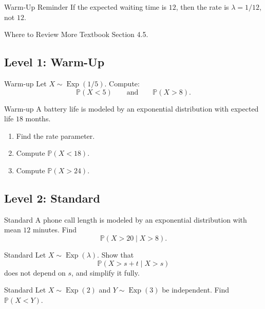 \documentclass[12pt]{article}
\newcommand{\PP}{\mathbb{P}}
\newcommand{\Exp}{\operatorname{Exp}}
\newcommand{\writespace}[1]{\vspace*{#1}}
\newcommand{\medws}{\writespace{1.8cm}}
\newcounter{problem}[section]
\begin{document}
\begin{examplebox}{Warm-Up Reminder}
If the expected waiting time is $12$, then the rate is $\lambda=1/12$, not $12$.
\end{examplebox}

\begin{reviewbox}{Where to Review More}
Textbook Section 4.5.
\end{reviewbox}

\subsection*{Level 1: Warm-Up}

\begin{practiceproblem}{Warm-up}
Let $X\sim\Exp(1/5)$. Compute:
\[
  \PP(X<5)
  \qquad\text{and}\qquad
  \PP(X>8).
\]
\end{practiceproblem}
\medws

\begin{practiceproblem}{Warm-up}
A battery life is modeled by an exponential distribution with expected life $18$ months.
\begin{enumerate}
  \item Find the rate parameter.
  \item Compute $\PP(X<18)$.
  \item Compute $\PP(X>24)$.
\end{enumerate}
\end{practiceproblem}
\medws

\subsection*{Level 2: Standard}

\begin{practiceproblem}{Standard}
A phone call length is modeled by an exponential distribution with mean $12$ minutes. Find
\[
  \PP(X>20\mid X>8).
\]
\end{practiceproblem}
\medws

\begin{practiceproblem}{Standard}
Let $X\sim\Exp(\lambda)$. Show that
\[
  \PP(X>s+t\mid X>s)
\]
does not depend on $s$, and simplify it fully.
\end{practiceproblem}
\medws

\begin{practiceproblem}{Standard}
Let $X\sim\Exp(2)$ and $Y\sim\Exp(3)$ be independent. Find $\PP(X<Y)$.
\end{practiceproblem}
\medws
\end{document}
